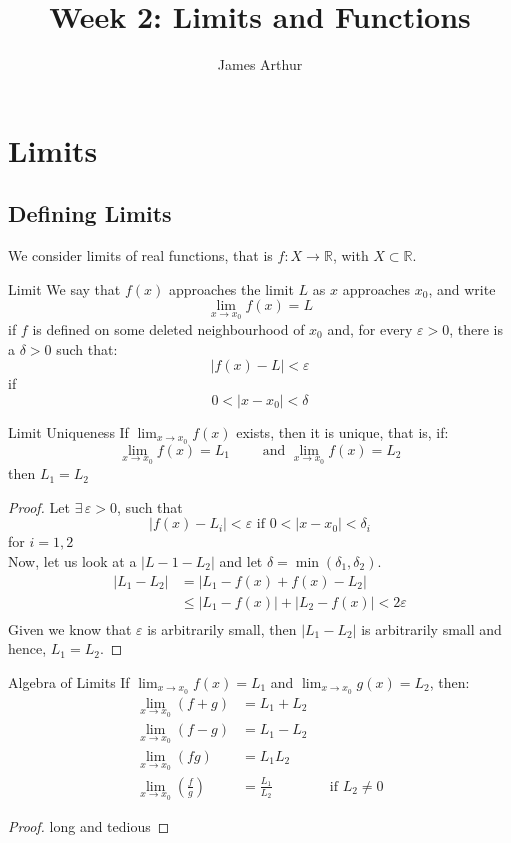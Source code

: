 \documentclass{article}
\title{Week 2: Limits and Functions}
\author{James Arthur}
\newcommand{\R}{\mathbb{R}}
\newcommand{\sub}{\subset}
\renewcommand{\d}{\delta}
\newcommand{\e}{\varepsilon}
\newcommand{\ex}{\exists\,}
\begin{document}
\maketitle
\tableofcontents
\newpage


\section{Limits}
\subsection{Defining Limits}

We consider limits of real functions, that is $f: X \to \R$, with $X\sub\R$.

\noindent\begin{definition}{Limit}{}{
 We say that $f(x)$ approaches the limit $L$ as $x$ approaches $x_0$, and write
 $$ \lim_{x\to x_0}{f(x)} = L$$
 if $f$ is defined on some deleted neighbourhood of $x_0$ and, for every $\e > 0$, there is a $\d > 0$ such that:
 $$ |f(x) - L| < \e $$
 if
 $$ 0 < |x - x_0| < \d $$
}\end{definition}\vspace{10pt}

\begin{theorem}{Limit Uniqueness}{}
  If $\displaystyle{\lim_{x\to x_0}{f(x)}}$ exists, then it is unique, that is, if:
  $$ \lim_{x\to x_0}{f(x)} = L_1 \qquad\text{ and }\lim_{x\to x_0}{f(x)} = L_2 $$
  then $\displaystyle{L_1 = L_2}$
\end{theorem}
\begin{proof}
  Let $\ex\e>0$, such that
  $$ |f(x) - L_i| < \e \text{ if } 0 < |x - x_0| < \d_i $$
  for $i=1, 2$\\

  Now, let us look at a $|L-1 - L_2|$ and let $\d = \min(\d_1, \d_2)$.
  \begin{align*}
    |L_1 - L_2| &= |L_1 - f(x) + f(x) - L_2| \\
    &\le |L_1 - f(x)| + |L_2 - f(x)| < 2\e \\
  \end{align*}
  Given we know that $\e$ is arbitrarily small, then $|L_1 - L_2|$ is arbitrarily small and hence, $L_1 = L_2$.
\end{proof}

\begin{theorem}{Algebra of Limits}{}
  If $\lim_{x\to x_0}{f(x)} = L_1$ and $\lim_{x\to x_0}{g(x)} = L_2$, then:
  \begin{align*}
    \lim_{x\to x_0}{(f + g)} &= L_1 + L_2 \\
    \lim_{x\to x_0}{(f - g)} &= L_1 - L_2 \\
    \lim_{x\to x_0}{(fg)} &= L_1L_2 \\
    \lim_{x\to x_0}{\left(\frac{f}{g}\right)} &= \frac{L_1}{L_2} && \text{if $L_2\neq 0$}
  \end{align*}
\end{theorem}
\begin{proof}
  long and tedious
\end{proof}
\end{document}
